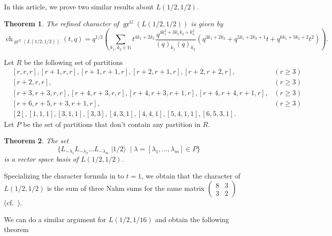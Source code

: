 \documentclass[a4paper, 12pt, reqno]{amsart}
\newtheorem{theorem}{Theorem}[section]
\theoremstyle{remark}
\DeclareMathOperator{\gr}{gr}
\DeclareMathOperator{\ch}{ch}
\DeclareMathOperator{\vachalf}{|1/2\rangle}
\begin{document}
In this article, we prove two similar results about $L(1/2,1/2)$.

\begin{theorem}
  \label{thr:3}
  The refined character of $\gr^G(L(1/2, 1/2))$ is given by
  \begin{equation*}
    \ch_{\gr^G(L(1/2, 1/2))}(t, q) = q^{1/2}\left(\sum_{k_1, k_2 \in \mathbb{N}}t^{4k_1 + 2k_2}\frac{q^{4k_1^2 + 3k_1k_2 + k_2^2}}{(q)_{k_1}(q)_{k_2}}(q^{3k_1 + 2k_2} + q^{5k_1 + 2k_2 + 1}t + q^{6k_1 + 3k_2 + 2}t^2)\right).
  \end{equation*}
\end{theorem}

Let $R$ be the following set of partitions
\begin{equation}
  \label{eq:1}
  \begin{aligned}
  &[r, r, r], [r + 1, r, r], [r + 1, r + 1, r], [r + 2, r + 1, r], [r + 2, r + 2, r], &(r \ge 3) \\
  &[r + 2, r, r], &(r \ge 3) \\
  &[r + 3, r + 3, r, r], [r + 4, r + 3, r, r],  [r + 4, r + 3, r + 1, r], [r + 4, r + 4, r + 1, r], &(r \ge 3)\\
  &[r + 6, r + 5, r + 3, r + 1, r], &(r \ge 3) \\
  &[2], [1, 1, 1], [3, 1, 1], [3, 3], [4, 3, 1], [4, 4, 1], [5, 4, 1, 1], [6, 5, 3, 1].
  \end{aligned}
\end{equation}
Let $P$ be the set of partitions that don't contain any partition in $R$.

\begin{theorem}
  \label{thr:4}
  The set
  \begin{equation*}
    \{L_{-\lambda_1}L_{-\lambda_2}\dots L_{-\lambda_m}\vachalf \mid \lambda = [\lambda_1, \dots, \lambda_m] \in P\}
  \end{equation*}
  is a vector space basis of $L(1/2, 1/2)$.
\end{theorem}

Specializing the character formula in  to $t = 1$, we obtain that the character of $L(1/2, 1/2)$ is the sum of three Nahm sums for the same matrix $\left(\begin{smallmatrix} 8 & 3 \\ 3 & 2 \end{smallmatrix}\right)$ (cf.\ \cite{Nahm2007}).

We can do a similar argument for $L(1/2, 1/16)$ and obtain the following theorem
\end{document}
